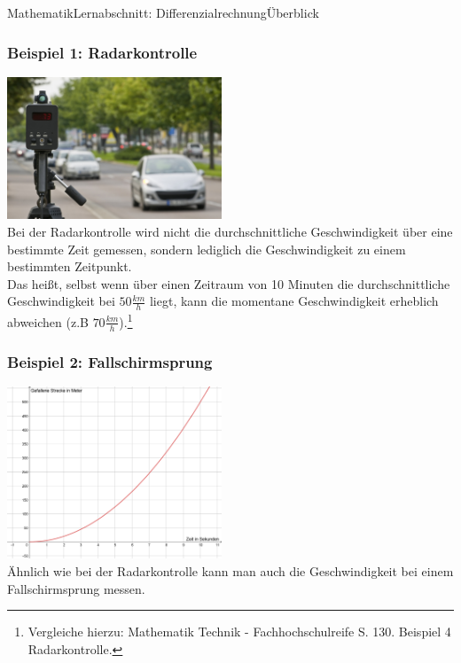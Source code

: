 \documentclass[11pt,twocolumn,oneside,openany,headings=optiontotoc,11pt,numbers=noenddot,final]{article}
\begin{document}
\begin{worksheet}{Mathematik}{Lernabschnitt: Differenzialrechnung}{Überblick}
		\subsubsection*{Beispiel 1: Radarkontrolle}
		\includegraphics[width=0.48\textwidth]{../99_Bilder/04_Skr_momAen.jpg}\\
		Bei der Radarkontrolle wird nicht die durchschnittliche Geschwindigkeit über eine bestimmte Zeit gemessen, sondern lediglich die Geschwindigkeit zu einem bestimmten Zeitpunkt.\\
		Das heißt, selbst wenn über einen Zeitraum von 10 Minuten die durchschnittliche Geschwindigkeit bei \(50 \frac{km}{h}\) liegt, kann die momentane Geschwindigkeit erheblich abweichen (z.B \(70 \frac{km}{h}\)).\footnote{Vergleiche hierzu: Mathematik Technik - Fachhochschulreife S. 130. Beispiel 4 Radarkontrolle.}
		\subsubsection*{Beispiel 2: Fallschirmsprung}
		\includegraphics[width=0.48\textwidth]{../99_Bilder/04_Skr_FallS.jpg}\\
		Ähnlich wie bei der Radarkontrolle kann man auch die Geschwindigkeit bei einem Fallschirmsprung messen.

\end{worksheet}
\end{document}
